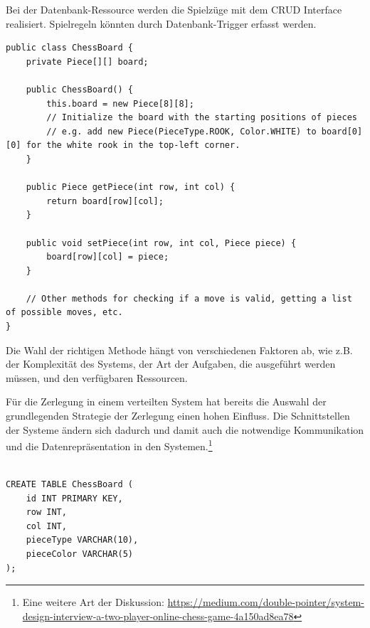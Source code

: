 \documentclass[../vs-script-first-v01.tex]{subfiles}
\begin{document}
Bei der Datenbank-Ressource werden die Spielzüge mit dem CRUD Interface realisiert. Spielregeln könnten durch Datenbank-Trigger erfasst werden. 
\noindent\begin{minipage}{\textwidth}
\begin{lstlisting}[caption={Schachbrett - Objektorientiert},captionpos=b,label={lst:schachbrett-oo}]
public class ChessBoard {
    private Piece[][] board;

    public ChessBoard() {
        this.board = new Piece[8][8];
        // Initialize the board with the starting positions of pieces
        // e.g. add new Piece(PieceType.ROOK, Color.WHITE) to board[0][0] for the white rook in the top-left corner.
    }

    public Piece getPiece(int row, int col) {
        return board[row][col];
    }

    public void setPiece(int row, int col, Piece piece) {
        board[row][col] = piece;
    }

    // Other methods for checking if a move is valid, getting a list of possible moves, etc.
}
\end{lstlisting}
\end{minipage}

Die Wahl der richtigen Methode hängt von verschiedenen Faktoren ab, wie z.B. der Komplexität des Systems, der Art der Aufgaben, die ausgeführt werden müssen, und den verfügbaren Ressourcen.

Für die Zerlegung in einem verteilten System hat bereits die Auswahl der grundlegenden Strategie der Zerlegung einen hohen Einfluss. Die Schnittstellen der Systeme ändern sich dadurch und damit auch die notwendige Kommunikation und die Datenrepräsentation in den Systemen.\footnote{Eine weitere Art der Diskussion: \url{https://medium.com/double-pointer/system-design-interview-a-two-player-online-chess-game-4a150ad8ea78} }

\noindent\begin{minipage}{\textwidth}
\begin{lstlisting}[caption={Schachbrett - Datenbank},captionpos=b,label={lst:schachbrett-datenbank}]

CREATE TABLE ChessBoard (
    id INT PRIMARY KEY,
    row INT,
    col INT,
    pieceType VARCHAR(10),
    pieceColor VARCHAR(5)
);
\end{lstlisting}
\end{minipage}
\end{document}
